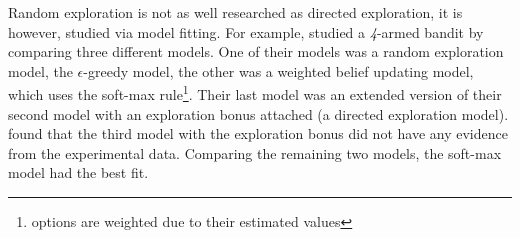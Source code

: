 Random exploration is not as well researched as directed exploration, it is however, studied via model fitting.  
For example, \cite{daw2006cortical} studied a \textit{4}-armed bandit by comparing three different models. One of their models was a random exploration model, the $\epsilon$-greedy model, the other was a weighted belief updating model, which uses the soft-max rule\footnote{options are weighted due to their estimated values}. Their last model was an extended version of their second model with an exploration bonus attached (a directed exploration model). \citeauthor{daw2006cortical} found that the third model with the exploration bonus did not have any evidence from the experimental data. Comparing the remaining two models, the soft-max model had the best fit. %

